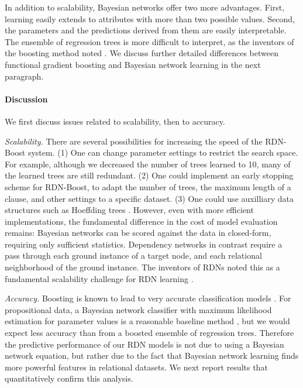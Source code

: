 \documentclass[runningheads,a4paper]{llncs}
\begin{document}
In addition to scalability, Bayesian networks offer two more advantages. First, learning easily extends to attributes with more than two possible values. Second, the parameters and the predictions derived from them are easily interpretable. The ensemble of regression trees is more difficult to interpret, as the inventors of the boosting method noted  \cite{Natarajan2012}. We discuss further detailed differences between functional gradient boosting and Bayesian network learning in the next paragraph. 

 \paragraph{Discussion} We first discuss issues related to scalability, then to accuracy.
 
 {\em Scalability.} There are several possibilities for increasing the speed of the RDN-Boost system. (1) One can change parameter settings to restrict the search space. For example, although we decreased the number of trees learned to 10, many of the learned trees are still redundant. (2) One could implement an early stopping scheme for RDN-Boost, to adapt the number of trees, the maximum length of a clause, and other settings to a specific dataset. (3) One could use auxilliary data structures such as Hoeffding trees \cite{hoeffding}. However, even with more efficient implementations, the fundamental difference in the cost of model evaluation remains: Bayesian networks can be scored against the data in closed-form, requiring only sufficient statistics. Dependency networks in contrast require a pass through each ground instance of a target node, and each relational neighborhood of the ground instance. The inventors of RDNs noted this as a fundamental scalability challenge for RDN learning \cite{Neville2007}. 
 
 {\em Accuracy.} Boosting is known to lead to very accurate classification models \cite{Bishop2006}. For propositional data, a Bayesian network classifier with maximum likelihood estimation for parameter values is a reasonable baseline method \cite{Grossman2004}, but we would expect less accuracy than from a boosted ensemble of regression trees. Therefore the predictive performance of our RDN models is not due to using a Bayesian network equation, but rather due to the fact that Bayesian network learning finds more powerful features in relational datasets. We next report results that quantitatively confirm this analysis. 
 
\end{document}
